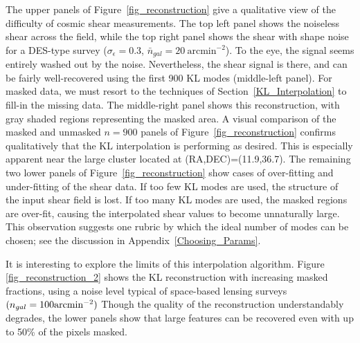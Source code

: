The upper panels of Figure~\ref{fig_reconstruction} give a qualitative view
of the difficulty of cosmic shear measurements.  The top left panel shows the
noiseless shear across the field, while the top right panel shows the
shear with shape noise for a DES-type survey ($\sigma_\epsilon=0.3$, 
$\bar{n}_{gal} = 20\ \mathrm{arcmin}^{-2}$).  To the eye, the signal seems
entirely washed out by the noise.  Nevertheless, the shear signal is there,
and can be fairly well-recovered using the first 900 KL modes 
(middle-left panel). For masked data, we must resort to the 
techniques of Section~\ref{KL_Interpolation} to fill-in the missing data.
The middle-right panel shows this reconstruction, with gray shaded
regions representing the masked area.  A visual comparison of the masked 
and unmasked $n=900$ panels of Figure~\ref{fig_reconstruction} confirms
qualitatively that the KL interpolation is performing as desired.  This is
especially apparent near the large cluster located at (RA,DEC)=(11.9,36.7).  
The remaining two lower panels of Figure~\ref{fig_reconstruction} 
show cases of over-fitting and under-fitting
of the shear data. If too few KL modes are used, the structure of the input 
shear field is lost.  If too many KL modes are used, the masked regions 
are over-fit,
causing the interpolated shear values to become unnaturally large.  This
observation suggests one rubric by which the ideal number of modes can be
chosen; see the discussion in Appendix~\ref{Choosing_Params}.

It is interesting to explore the limits of this interpolation algorithm.
Figure \ref{fig_reconstruction_2} shows the KL reconstruction with
increasing masked fractions, using a noise level typical of space-based
lensing surveys $(n_{gal}=100{\rm arcmin}^{-2})$  Though the quality of
the reconstruction understandably degrades, the lower panels show that
large features can be recovered even with up to 50\% of the pixels masked.


